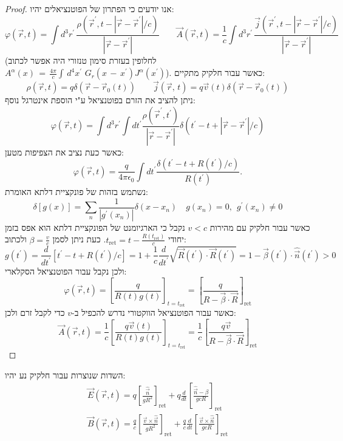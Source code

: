 \documentclass{tstextbook}
\begin{document}
\begin{proof}
אנו יודעים כי הפתרון של הפוטנציאלים יהיו:
$$\varphi\left( \vec{r},t \right)=\int d^{3}r^{\prime}\,{\frac{\rho\left( \vec{r}^{\prime},t-|\vec{r}-\vec{r}^{\prime}|/c \right)}{|\vec{r}-\vec{r}^{\prime}|}}\qquad \vec{A}(\vec{r},t)={\frac{1}{c}}\int d^{3}r^{\prime}\,{\frac{{\vec{j}(\vec{r}^{\prime},t-|\vec{r}-\vec{r}^{\prime}|/c)}}{|\vec{r}-\vec{r}^{\prime}|}}$$
(לחלופין בעזרת סימון טנזורי היה אפשר לכתוב \({ A}^{\alpha}(x)\,=\,\frac{4\pi}{c}\int\,d^{4}x^{\prime}\,\,G_{r}(x\,-\,x^{\prime})J^{\alpha}(x^{\prime})\)). כאשר עבור חלקיק מתקיים:
$$\rho\left( {\vec r},t \right)=q\delta\left( {\vec r}-{\vec r}_{0}(t) \right)\qquad {\vec j}({\vec r},\,t)=q{\vec v}(t)\delta({\vec r}-{\vec r}_{0}(t))$$
ניתן להציב את הזרם בפוטנציאל ע"י הוספת אינטרגל נוסף:
$$\varphi(\vec{r},t)={ }\int d^{3}r^{\prime}\int d t^{\prime}{\frac{\rho(\vec{r}^{\prime},t^{\prime})}{|\vec{r}-\vec{r}^{\prime}|}}\delta(t^{\prime}-t+|\vec{r}-\vec{r}^{\prime}|/c)$$
כאשר כעת נציב את הצפיפות מטען:
$$\varphi({\vec r},t)=\frac{q}{4\pi\epsilon_{0}}\int d t^{\prime}\frac{\delta(t^{\prime}-t+R(t^{\prime})/c)}{R(t^{\prime})}.$$
נשתמש בזהות של פונקציית דלתא האומרת:
$$\delta[g(x)]=\sum_{n}\frac{1}{|g^{\prime}(x_{n})|}\delta(x-x_{n})\quad g(x_{n})=0,\ \ g^{\prime}(x_{n})\ne0$$
כאשר עבור חלקיק עם מהירות \(v<c\) נקבל כי הארגיומנט של הפונקציית דלתא הוא אפס בזמן יחודי \(t_{\mathrm{ret}}=t-{\frac{R(t_{\mathrm{ret}})}{c}}\). כעת ניתן לסמן \(\beta=\frac{v}  {c}\) ולכתוב:
$$g(t^{\prime})={\frac{d}{d t^{\prime}}}\left[t^{\prime}-t+R(t^{\prime})/c\right]=1+{\frac{1}{c}}{\frac{d}{d t^{\prime}}}{\sqrt{\vec{R}(t^{\prime})\cdot\vec{R}(t^{\prime})}}=1-{\vec{\beta}}(t^{\prime})\cdot{\hat{\vec{n}}}(t^{\prime})>0$$
ולכן נקבל עבור הפוטנציאל הסקלארי:
$$\varphi(\vec{r},t)={ }\left[{\frac{q}{R(t)g(t)}}\right]_{t=t_{\mathrm{ret}}}={ }\left[{\frac{q}{R-{\vec{\beta}}\cdot\vec{R}}}\right]_{\mathrm{ret}}$$
כאשר עבור הפוטנציאל הווקטורי נדרש להכפיל ב-\(v\) כדי לקבל זרם ולכן:
$$\vec{A}(\vec{r},t)={ \frac{1}{c}}\left[{\frac{q\vec{v}(t)}{R(t)g(t)}}\right]_{t=t_{\mathrm{rel}}}={ \frac{1}{c}}\left[{\frac{q\vec{v}}{R-{\vec{\beta}}\cdot\vec{R}}}\right]_{\mathrm{ret}}$$

\end{proof}
\begin{proposition}
השדות שנוצרות עבור חלקיק נע יהיו:
\begin{gather*}\vec{E}(\vec{r},t)=q\left[{\frac{\hat{\vec{n}}}{g R^{2}}}\right]_{\mathrm{ret}}+q{\frac{d}{d t}}\left[{\frac{\hat{\vec{n}}-\beta}{g c R}}\right]_{\mathrm{ret}} \\\vec{B}(\vec{r},t)={\frac{q}{c}}\left[{\frac{\vec{v}\times{\hat{\vec{n}}}}{g R^{2}}}\right]_{\mathrm{ret}}+{\frac{q}{c}}{\frac{d}{d t}}\left[{\frac{\vec{v}\times{\hat{\vec{n}}}}{g c R}}\right]_{\mathrm{ret}}
\end{gather*}

\end{proposition}
\end{document}
